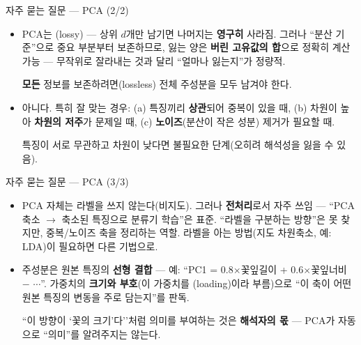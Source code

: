 \documentclass[aspectratio=169,11pt]{beamer}
\begin{document}
\begin{frame}{자주 묻는 질문 --- PCA (2/2)}
  \small
  \begin{itemize}
    \item {}
      PCA는 (lossy) --- 상위 $d$개만 남기면 나머지는
      \textbf{영구히} 사라짐. 그러나 ``분산 기준''으로 중요 부분부터
      보존하므로, 잃는 양은 \textbf{버린 고유값의 합}으로 정확히 계산
      가능 --- 무작위로 잘라내는 것과 달리 ``얼마나 잃는지''가 정량적.
      \par \textbf{모든} 정보를 보존하려면(lossless) 전체 주성분을
      모두 남겨야 한다.
    \item {}
      아니다. 특히 잘 맞는 경우: (a) 특징끼리 \textbf{상관}되어 중복이
      있을 때, (b) 차원이 높아 \textbf{차원의 저주}가 문제일 때,
      (c) \textbf{노이즈}(분산이 작은 성분) 제거가 필요할 때.
      \par 특징이 서로 무관하고 차원이 낮다면 불필요한 단계(오히려
      해석성을 잃을 수 있음).
  \end{itemize}
\end{frame}
\begin{frame}{자주 묻는 질문 --- PCA (3/3)}
  \small
  \begin{itemize}
    \item {}
      PCA 자체는 라벨을 쓰지 않는다(비지도). 그러나 \textbf{전처리}로서
      자주 쓰임 --- ``PCA 축소 $\to$ 축소된 특징으로 분류기 학습''은
      표준. \; ``라벨을 구분하는 방향''은 못 찾지만, 중복/노이즈 축을
      정리하는 역할. \; 라벨을 아는 방법(지도 차원축소, 예: LDA)이
      필요하면 다른 기법으로.
    \item {}
      주성분은 원본 특징의 \textbf{선형 결합} --- 예:
      ``PC1 = 0.8$\times$꽃잎길이 + 0.6$\times$꽃잎너비 $-$ $\cdots$''.
      \; 가중치의 \textbf{크기와 부호}(이 가중치를 (loading)이라
      부름)으로 ``이 축이 어떤 원본 특징의 변동을 주로 담는지''를 판독.
      \par ``이 방향이 `꽃의 크기'다''처럼 의미를 부여하는 것은
      \textbf{해석자의 몫} --- PCA가 자동으로 ``의미''를 알려주지는
      않는다.
  \end{itemize}
\end{frame}
\end{document}
